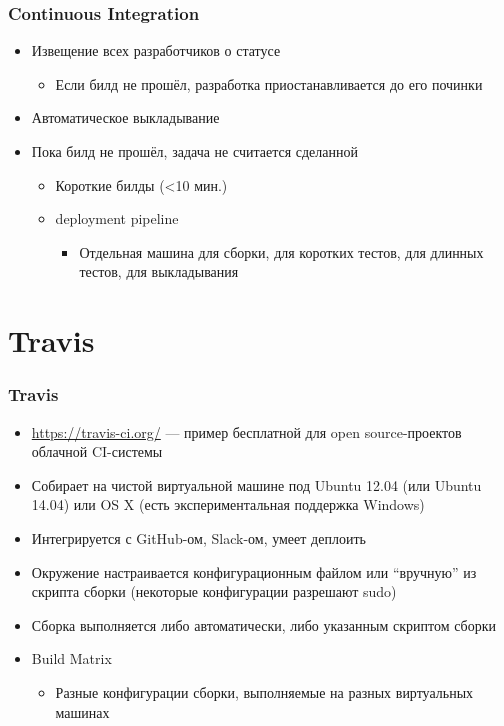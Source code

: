 \documentclass[xetex,mathserif,serif]{beamer}
\begin{document}
	\begin{frame}
		\frametitle{Continuous Integration}
		\begin{itemize}
			\item Извещение всех разработчиков о статусе
			\begin{itemize}
				\item Если билд не прошёл, разработка приостанавливается до его починки
			\end{itemize}
			\item Автоматическое выкладывание
			\item Пока билд не прошёл, задача не считается сделанной
			\begin{itemize}
				\item Короткие билды (<10 мин.)
				\item deployment pipeline
				\begin{itemize}
					\item Отдельная машина для сборки, для коротких тестов, для длинных тестов, для выкладывания
				\end{itemize}
			\end{itemize}
		\end{itemize}
	\end{frame}

	\section{Travis}

	\begin{frame}
		\frametitle{Travis}
		\begin{itemize}
			\item \url{https://travis-ci.org/} --- пример бесплатной для open source-проектов облачной CI-системы
			\item Собирает на чистой виртуальной машине под Ubuntu 12.04 (или Ubuntu 14.04) или OS X (есть экспериментальная поддержка Windows)
			\item Интегрируется с GitHub-ом, Slack-ом, умеет деплоить
			\item Окружение настраивается конфигурационным файлом или ``вручную'' из скрипта сборки (некоторые конфигурации разрешают sudo)
			\item Сборка выполняется либо автоматически, либо указанным скриптом сборки
			\item Build Matrix
			\begin{itemize}
				\item Разные конфигурации сборки, выполняемые на разных виртуальных машинах
			\end{itemize}
		\end{itemize}
	\end{frame}
\end{document}
